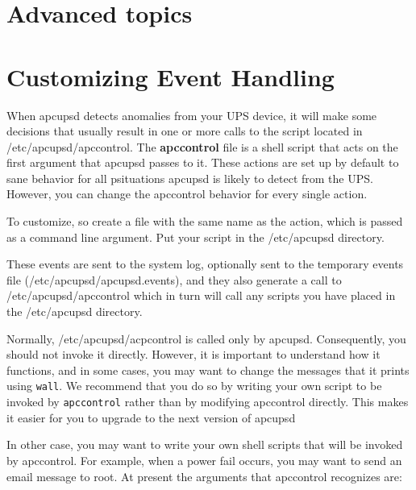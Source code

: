 {{{{{{\section*{Advanced topics}

\label{index-Advanced-149}

\label{Customizing-Event-Handling}

\section*{Customizing Event Handling}

\label{index-Event-handling-150}
\label{index-Customizing-event-handling-151}

When apcupsd detects anomalies from your UPS device, it will make some
decisions that usually result in one or more calls to the script located in
/etc/apcupsd/apccontrol. The {\bf apccontrol} file is a shell script that acts
on the first argument that apcupsd passes to it. These actions are set up by
default to sane behavior for all psituations apcupsd is likely to detect from
the UPS. However, you can change the apccontrol behavior for every single
action.  

To customize, so create a file with the same name as the action, which is
passed as a command line argument. Put your script in the /etc/apcupsd
directory.  

These events are sent to the system log, optionally sent to the temporary
events file (/etc/apcupsd/apcupsd.events), and they also generate a call to
/etc/apcupsd/apccontrol which in turn will call any scripts you have placed in
the /etc/apcupsd directory.  

Normally, /etc/apcupsd/acpcontrol is called only by apcupsd. Consequently, you
should not invoke it directly.  However, it is important to understand how it
functions, and in some cases, you may want to change the messages that it
prints using {\tt wall}. We recommend that you do so by writing your own
script to be invoked by {\tt apccontrol} rather than by modifying apccontrol
directly. This makes it easier for you to upgrade to the next version of
apcupsd  

In other case, you may want to write your own shell scripts that will be
invoked by apccontrol. For example, when a power fail occurs, you may want to
send an email message to root. At present the arguments that apccontrol
recognizes are:  

}}}}}}
